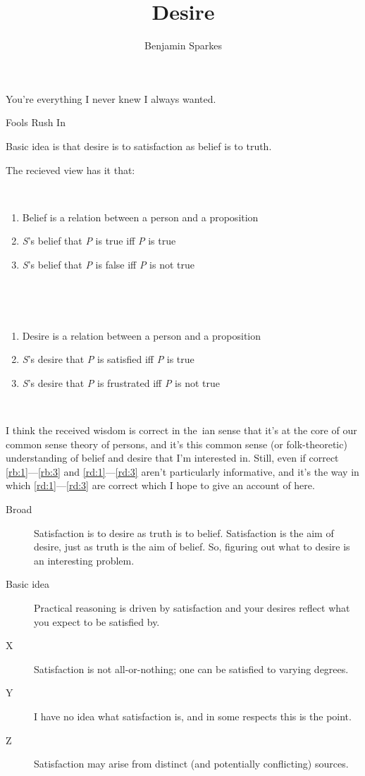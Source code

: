 \documentclass[10pt]{article}
\title{Desire}
\author{Benjamin Sparkes}
\begin{document}
\maketitle
\epigraph{You're everything I never knew I always wanted.}{Fools Rush In}


Basic idea is that desire is to satisfaction as belief is to truth.


The recieved view has it that:

\begin{minipage}{0.45\linewidth}\mbox{ }
\begin{enumerate}[labelindent=\parindent,leftmargin=*,label=(RB\arabic*)]
\item\label{rb:1} Belief is a relation between a person and a proposition
\item\label{rb:2} \emph{S}’s belief that \emph{P} is true iff \emph{P} is true
\item\label{rb:3} \emph{S}’s belief that \emph{P} is false iff \emph{P} is not true
\end{enumerate}\mbox{ }
\end{minipage}\hfill
\begin{minipage}{0.45\linewidth}\mbox{ }
\begin{enumerate}[labelindent=\parindent,leftmargin=*,label=(RD\arabic*)]
\item\label{rd:1} Desire is a relation between a person and a proposition
\item\label{rd:2} \emph{S}’s desire that \emph{P} is satisfied iff \emph{P} is true
\item\label{rd:3} \emph{S}’s desire that \emph{P} is frustrated iff \emph{P} is not true
\end{enumerate}\mbox{ }
\end{minipage}

I think the received wisdom is correct in the~\citeauthor{Lewis:1974aa}ian sense that it's at the core of our common sense theory of persons, and it's this common sense (or folk-theoretic) understanding of belief and desire that I'm interested in.
Still, even if correct \ref{rb:1}---\ref{rb:3} and \ref{rd:1}---\ref{rd:3} aren't particularly informative, and it's the way in which \ref{rd:1}---\ref{rd:3} are correct which I hope to give an account of here.

\begin{description}
\item[Broad] Satisfaction is to desire as truth is to belief.
  Satisfaction is the aim of desire, just as truth is the aim of belief.
  So, figuring out what to desire is an interesting problem.
\item[Basic idea] Practical reasoning is driven by satisfaction and your desires reflect what you expect to be satisfied by.
\item[X] Satisfaction is not all-or-nothing; one can be satisfied to varying degrees.
\item[Y] I have no idea what satisfaction is, and in some respects this is the point.
\item[Z] Satisfaction may arise from distinct (and potentially conflicting) sources.
\end{description}
\end{document}
